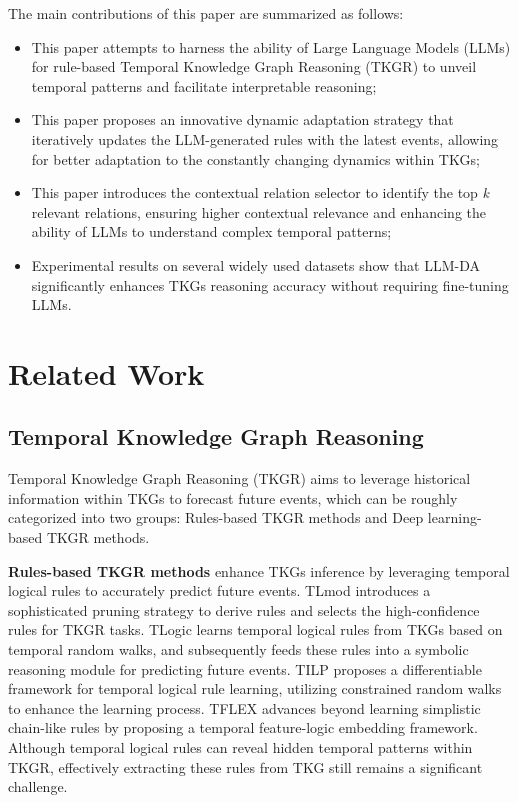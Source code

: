 \documentclass{article}
\begin{document}
The main contributions of this paper are summarized as follows:

\begin{itemize}
    \item This paper attempts to harness the ability of Large Language Models (LLMs) for rule-based Temporal Knowledge Graph Reasoning (TKGR) to unveil temporal patterns and facilitate interpretable reasoning;
    \item This paper proposes an innovative dynamic adaptation strategy that iteratively updates the LLM-generated rules with the latest events, allowing for better adaptation to the constantly changing dynamics within TKGs;
    \item This paper introduces the contextual relation selector to identify the top \textit{k} relevant relations, ensuring higher contextual relevance and enhancing the ability of LLMs to understand complex temporal patterns;
    \item Experimental results on several widely used datasets show that LLM-DA significantly enhances TKGs reasoning accuracy without requiring fine-tuning LLMs.
\end{itemize}

\section{Related Work}

\subsection{Temporal Knowledge Graph Reasoning}

Temporal Knowledge Graph Reasoning (TKGR) \citep{bai2023multi, ge2022spatio,liang2023knowledge,liang2024mines,wang2024unifying,wang2024ime, wang2024made} aims to leverage historical information within TKGs to forecast future events, which can be roughly categorized into two groups: Rules-based TKGR methods and Deep learning-based TKGR methods.

\textbf{Rules-based TKGR methods} \citep{li2024noise} enhance TKGs inference by leveraging temporal logical rules to accurately predict future events. TLmod \citep{bai2023temporal} introduces a sophisticated pruning strategy to derive rules and selects the high-confidence rules for TKGR tasks. TLogic \citep{liu2022tlogic} learns temporal logical rules from TKGs based on temporal random walks, and subsequently feeds these rules into a symbolic reasoning module for predicting future events. TILP \citep{xiong2023tilp} proposes a differentiable framework for temporal logical rule learning, utilizing constrained random walks to enhance the learning process. TFLEX \citep{lin2022tflex} advances beyond learning simplistic chain-like rules by proposing a temporal feature-logic embedding framework. 
Although temporal logical rules can reveal hidden temporal patterns within TKGR, effectively extracting these rules from TKG still remains a significant challenge.
\end{document}
